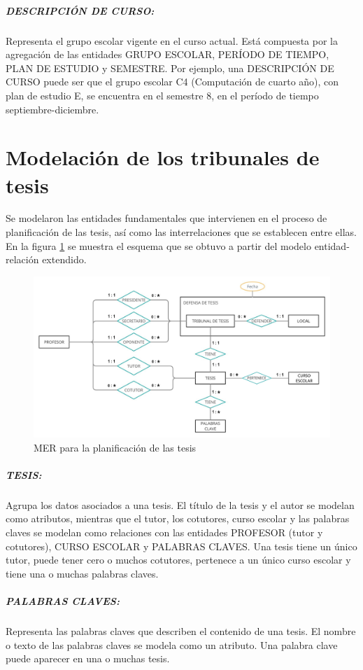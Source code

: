 \subparagraph{DESCRIPCIÓN DE CURSO:}
Representa el grupo escolar vigente en el curso actual. Está 
compuesta por la agregación de las entidades GRUPO ESCOLAR,
PERÍODO DE TIEMPO, PLAN DE ESTUDIO y SEMESTRE.  
Por ejemplo, una DESCRIPCIÓN DE CURSO puede ser 
que el grupo escolar C4 (Computación de cuarto año), con plan de
estudio E, se encuentra en el semestre 8,  en el período de tiempo septiembre-diciembre.






\section{Modelación de los tribunales de tesis}\label{database:planificación-tesis}
Se modelaron las entidades fundamentales 
que intervienen en el proceso de planificación de las tesis, así como 
las interrelaciones que se establecen entre ellas. En la figura 
\ref{merxx-thesis} se muestra el esquema que se obtuvo a partir del 
modelo entidad-relación extendido.


\begin{figure}[H]
    \includegraphics[scale=0.31]{Graphics/Database/MERXX-TC-FINAL.png}
    \caption{MER para la planificación de las tesis}
    \label{merxx-thesis}
\end{figure}


\subparagraph{TESIS:}
Agrupa los datos asociados a una tesis.
El título de la tesis y el autor se modelan como atributos, mientras que
el tutor, los cotutores, curso escolar y las palabras claves se modelan como relaciones con 
las entidades PROFESOR (tutor y cotutores), CURSO ESCOLAR y PALABRAS CLAVES.
Una tesis tiene un único tutor, puede tener cero o muchos cotutores, pertenece a 
un único curso escolar y tiene una o muchas palabras claves. 

\subparagraph{PALABRAS CLAVES:}
Representa las palabras claves que describen el contenido de una tesis.
El nombre o texto de las palabras claves se modela como un atributo. Una 
palabra clave puede aparecer en una o muchas tesis. 



